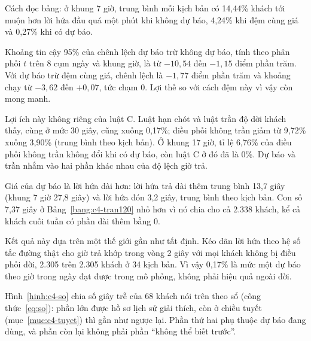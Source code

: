 Cách đọc bảng: ở khung 7 giờ, trung bình mỗi kịch bản có 14,44\% khách tới muộn hơn lời hứa đầu quá một phút khi
không dự báo, 4,24\% khi đệm cùng giá và 0,27\% khi có dự báo.

Khoảng tin cậy 95\% của chênh lệch dự báo trừ không dự báo, tính theo phân phối $t$ trên 8 cụm ngày và khung giờ, là
từ $-10{,}54$ đến $-1{,}15$ điểm phần trăm. Với dự báo trừ đệm cùng giá, chênh lệch là $-1{,}77$ điểm phần trăm và
khoảng chạy từ $-3{,}62$ đến $+0{,}07$, tức chạm 0. Lợi thế so với cách đệm này vì vậy còn mong manh.

Lợi ích này không riêng của luật C. Luật hạn chót và luật trần độ dời khách thấy, cùng ở mức 30 giây, cũng xuống
0,17\%; điều phối không trần giảm từ 9,72\% xuống 3,90\% (trung bình theo kịch bản). Ở khung 17 giờ, tỉ lệ 6,76\% của
điều phối không trần không đổi khi có dự báo, còn luật C ở đó đã là 0\%. Dự báo và trần nhắm vào hai phần khác nhau
của độ lệch giờ trả.

Giá của dự báo là lời hứa dài hơn: lời hứa trả dài thêm trung bình 13,7 giây (khung 7 giờ 27,8 giây) và lời hứa đón
3,2 giây, trung bình theo kịch bản. Con số 7,37 giây ở Bảng~\ref{bang:c4-tran120} nhỏ hơn vì nó chia cho cả 2.338
khách, kể cả khách cuối tuần có phần dài thêm bằng 0.

Kết quả này dựa trên một thế giới gần như tất định. Kéo dãn lời hứa theo hệ số tắc đường thật cho giờ trả khớp trong
vòng 2 giây với mọi khách không bị điều phối dời, 2.305 trên 2.305 khách ở 34 kịch bản. Vì vậy 0,17\% là mức một dự
báo theo giờ trong ngày đạt được trong mô phỏng, không phải hiệu quả ngoài đời.

Hình~\ref{hinh:c4-so} chia số giây trễ của 68 khách nói trên theo sổ (công thức~\eqref{eq:so}): phần lớn được hồ sơ
lịch sử giải thích, còn ở chiều tuyết (mục~\ref{muc:c4-tuyet}) thì gần như ngược lại. Phần thứ hai phụ thuộc dự báo
đang dùng, và phần còn lại không phải phần ``không thể biết trước''.

